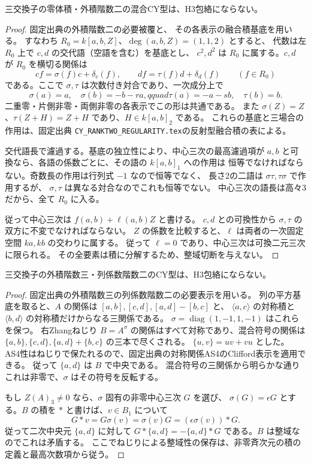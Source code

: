 \begin{proposition}\label{prop:cubic-CY-three-mixed-rank-two-empty}
三交換子の零体積・外積階数二の混合CY型は、H3包絡にならない。
\end{proposition}
\begin{proof}
固定出典\cite{AS4CYpinned}の外積階数二の必要被覆と、
その各表示の融合積基底を用いる。
すなわち $R_0=k[a,b,Z]$、$\deg(a,b,Z)=(1,1,2)$ とすると、
代数は左 $R_0$ 上で $c,d$ の交代語（空語を含む）を基底とし、
$c^2,d^2$ は $R_0$ に属する。$c,d$ が $R_0$ を横切る関係は
\[
 cf=\sigma(f)c+\delta_c(f),\qquad
 df=\tau(f)d+\delta_d(f)\qquad(f\in R_0)
\]
である。ここで $\sigma,\tau$ は次数付き対合であり、一次成分上で
\[
 \sigma(a)=a,\quad\sigma(b)=-b-ra,qquad
 \tau(a)=-a-sb,\quad\tau(b)=b .
\]
二重零・片側非零・両側非零の各表示でこの形は共通である。
また $\sigma(Z)=Z$、$\tau(Z+H)=Z+H$ であり、$H\in k[a,b]_2$ である。
これらの基底と三場合の作用は、固定出典
\texttt{CY\_RANKTWO\_REGULARITY.tex}\quad の反射型融合積の表による。

交代語長で濾過する。基底の独立性により、中心三次の最高濾過項が
$a,b$ と可換なら、各語の係数ごとに、その語の $k[a,b]_1$ への作用は
恒等でなければならない。奇数長の作用は行列式 $-1$ なので恒等でなく、
長さ2の二語は $\sigma\tau,\tau\sigma$ で作用するが、
$\sigma,\tau$ は異なる対合なのでこれも恒等でない。
中心三次の語長は高々3だから、全て $R_0$ に入る。

従って中心三次は $f(a,b)+\ell(a,b)Z$ と書ける。
$c,d$ との可換性から $\sigma,\tau$ の双方に不変でなければならない。
$Z$ の係数を比較すると、$\ell$ は両者の一次固定空間 $ka,kb$ の交わりに属する。
従って $\ell=0$ であり、中心三次は可換二元三次に限られる。
その全要素は積に分解するため、整域切断を与えない。
\end{proof}

\begin{proposition}\label{prop:cubic-CY-three-wedge-three-column-two-empty}
三交換子の外積階数三・列係数階数二のCY型は、H3包絡にならない。
\end{proposition}
\begin{proof}
固定出典\cite{AS4CYpinned}の外積階数三の列係数階数二の必要表示を用いる。
列の平方基底を取ると、$A$ の関係は
$[a,b],[c,d],[a,d]-[b,c]$ と、
$\langle a,c\rangle$ の対称積と $\langle b,d\rangle$ の対称積だけからなる三関係である。
$\sigma=\operatorname{diag}(1,-1,1,-1)$ はこれらを保つ。
右Zhangねじり $B=A^\sigma$ の関係はすべて対称であり、混合符号の関係は
$\{a,b\},\{c,d\},\{a,d\}+\{b,c\}$ の三本で尽くされる。
$\{u,v\}=uv+vu$ とした。
AS4性はねじりで保たれるので、固定出典の対称関係AS4のClifford表示を適用できる。
従って $\{a,d\}$ は $B$ で中央である。
混合符号の三関係から明らかな通りこれは非零で、$\sigma$ はその符号を反転する。

もし $Z(A)_3\ne0$ なら、$\sigma$ 固有の非零中心三次 $G$ を選び、
$\sigma(G)=\epsilon G$ とする。$B$ の積を $*$ と書けば、$v\in B_1$ について
\[
 G*v=G\sigma(v)=\sigma(v)G=(\epsilon\sigma(v))*G .
\]
従って二次中央元 $\{a,d\}$ に対して
$G*\{a,d\}=-\{a,d\}*G$ である。$B$ は整域なのでこれは矛盾する。
ここでねじりによる整域性の保存は、非零斉次元の積の定義と最高次数項から従う。
\end{proof}

